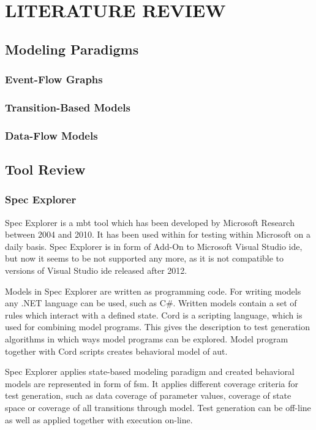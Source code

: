\chapter{LITERATURE REVIEW}
\label{chapter:literature_review}


\section{Modeling Paradigms}

\subsection{Event-Flow Graphs}
\subsection{Transition-Based Models}
\subsection{Data-Flow Models}

\section{Tool Review}
\subsection{Spec Explorer}
\par
Spec Explorer \cite{SpecExplorer_Description} is a \acrshort{mbt} tool which has been developed by Microsoft Research between 2004 and 2010. It has been used within for testing within Microsoft on a daily basis. Spec Explorer is in form of Add-On to Microsoft Visual Studio \acrshort{ide}, but now it seems to be not supported any more, as it is not compatible to versions of Visual Studio \acrshort{ide} released after 2012.
\par
Models in Spec Explorer are written as programming code. For writing models any .NET language can be used, such as C\#. Written models contain a set of rules which interact with a defined state. Cord is a scripting language, which is used for combining model programs. This gives the description to test generation algorithms in which ways model programs can be explored. Model program together with Cord scripts creates behavioral model of \acrlong{aut}.

\par
Spec Explorer applies state-based modeling paradigm and created behavioral models are represented in form of \acrshort{fsm}. It applies different coverage criteria for test generation, such as data coverage of parameter values, coverage of state space or coverage of all transitions through model. Test generation can be off-line as well as applied together with execution on-line.

